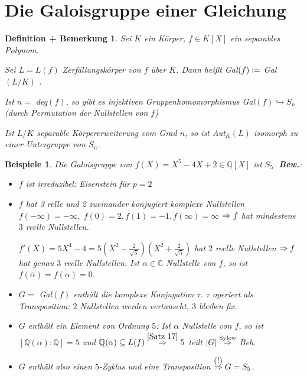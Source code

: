 \documentclass[a4paper,10pt,german]{scrbook}
\theoremstyle{saetze}
\theoremstyle{definitionen}
\newtheorem{DefBem}[Def]{Definition + Bemerkung}
\newtheorem{Bspe}[Def]{Beispiele}
\begin{document}
\section{Die Galoisgruppe einer Gleichung}

\begin{DefBem}
Sei $K$ ein Körper, $f \in K[X]$ ein separables Polynom.

\begin{enum}
\item Sei $L= L(f)$ Zerfällungskörper von $f$ über $K$. Dann heißt
Gal$(f) \mathrel{\mathop:}=$ Gal$(L/K)$ .

\item Ist $n =$ deg$(f)$, so gibt es injektiven
Gruppenhomomorphismus Gal$(f) \hookrightarrow S_n$ (durch
Permutation der Nullstellen von $f$)

\item Ist $L/K$ separable Körpererweiterung vom Grad $n$, so ist
Aut$_K(L)$ isomorph zu einer Untergruppe von $S_n$.

\end{enum}
\end{DefBem}

\begin{Bspe}
Die Galoisgruppe von $f(X) = X^5 - 4X + 2 \in
\mathbb{Q}[X]$ ist $S_5$.
\newline\newline\textbf{Bew.}:\begin{itemize}

\item $f$ ist irreduzibel: Eisenstein für $p=2$

\item $f$ hat 3 relle und 2 zueinander konjugiert komplexe
Nullstellen $f(-\infty) = -\infty,\;f(0)=2,f(1) =
-1,f(\infty)=\infty$ $\Rightarrow f$ hat mindestens $3$ reelle Nullstellen.

$f'(X) = 5X^4 - 4 = 5(X^2 - \frac{2}{\sqrt{5}})(X^2 +
\frac{2}{\sqrt{5}})$ hat $2$ reelle Nullstellen $\Rightarrow f$ hat genau
$3$ reelle Nullstellen. Ist $\alpha \in \mathbb{C}$ Nullstelle von
$f$, so ist $f(\bar \alpha) = \overline{f(\alpha)} = 0$.

\item $G=$ Gal$(f)$ enthält die komplexe Konjugation $\tau$. $\tau$
operiert als Transposition: $2$ Nullstellen werden vertauscht, $3$
bleiben fix.

\item $G$ enthält ein Element von Ordnung $5$: Ist $\alpha$
Nullstelle von $f$, so ist $[\mathbb{Q}(\alpha):\mathbb{Q}] = 5$ und
$\mathbb{Q}(\alpha) \subseteq L(f) \overset{\ref{Satz 17}}{\Rightarrow} 5$
teilt $|G| \overset{\mbox{\scriptsize Sylow}}{\Rightarrow}$ Beh.

\item $G$ enthält also einen $5$-Zyklus und eine Transposition
$\overset{\mbox{(!)}}{\Rightarrow} G = S_5$.
\end{itemize}
\end{Bspe}
\end{document}
